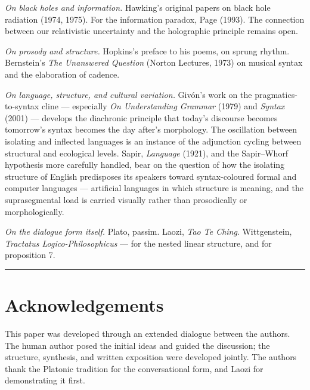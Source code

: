 \documentclass[11pt]{article}
\begin{document}
\textit{On black holes and information.} Hawking's original papers
on black hole radiation (1974, 1975). For the information paradox,
Page (1993). The connection between our relativistic uncertainty and
the holographic principle remains open.

\textit{On prosody and structure.} Hopkins's preface to his poems,
on sprung rhythm. Bernstein's \textit{The Unanswered Question}
(Norton Lectures, 1973) on musical syntax and the elaboration of
cadence.

\textit{On language, structure, and cultural variation.} Givón's
work on the pragmatics-to-syntax cline --- especially
\textit{On Understanding Grammar} (1979) and \textit{Syntax} (2001)
--- develops the diachronic principle that today's discourse
becomes tomorrow's syntax becomes the day after's morphology. The
oscillation between isolating and inflected languages is an
instance of the adjunction cycling between structural and ecological
levels. Sapir, \textit{Language} (1921), and the Sapir--Whorf
hypothesis more carefully handled, bear on the question of how the
isolating structure of English predisposes its speakers toward
syntax-coloured formal and computer languages --- artificial
languages in which structure is meaning, and the suprasegmental
load is carried visually rather than prosodically or
morphologically.

\textit{On the dialogue form itself.} Plato, passim. Laozi,
\textit{Tao Te Ching}. Wittgenstein, \textit{Tractatus
Logico-Philosophicus} --- for the nested linear structure, and
for proposition 7.

\bigskip\rule{\textwidth}{0.4pt}\bigskip


\section*{Acknowledgements}

This paper was developed through an extended dialogue between the
authors. The human author posed the initial ideas and guided the
discussion; the structure, synthesis, and written exposition were
developed jointly. The authors thank the Platonic tradition for the
conversational form, and Laozi for demonstrating it first.
\end{document}
